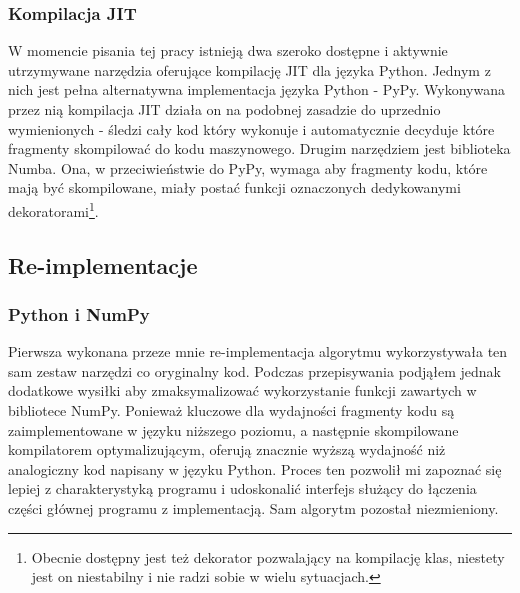 \documentclass[10pt, a4paper]{article}
\begin{document}
\begin{sloppypar}
    \subsubsection{Kompilacja JIT}


    W momencie pisania tej pracy istnieją dwa szeroko dostępne i aktywnie utrzymywane narzędzia
    oferujące kompilację JIT dla języka Python. Jednym z nich jest pełna alternatywna
    implementacja języka Python - PyPy\cite{PyPy_Home_Page}. Wykonywana przez nią
    kompilacja JIT działa on na podobnej zasadzie do uprzednio wymienionych - śledzi
    cały kod który wykonuje i automatycznie decyduje które fragmenty skompilować do kodu
    maszynowego\cite{PyPy_JIT}. Drugim narzędziem jest biblioteka Numba\cite{Numba_Article}\cite{Numba_Doc}.
    Ona, w przeciwieństwie do PyPy, wymaga aby fragmenty kodu, które mają być
    skompilowane, miały postać funkcji oznaczonych dedykowanymi dekoratorami\footnote{Obecnie
    dostępny jest też dekorator pozwalający na kompilację klas, niestety jest on niestabilny
    i nie radzi sobie w wielu sytuacjach.}.

    \newpage


    \subsection{Re-implementacje}


    \subsubsection{ Python i NumPy }


    Pierwsza wykonana przeze mnie re-implementacja algorytmu wykorzystywała ten sam zestaw
    narzędzi co oryginalny kod. Podczas przepisywania podjąłem jednak dodatkowe wysiłki
    aby zmaksymalizować wykorzystanie funkcji zawartych w bibliotece NumPy. Ponieważ kluczowe
    dla wydajności fragmenty kodu są zaimplementowane w języku niższego poziomu, a
    następnie skompilowane kompilatorem optymalizującym, oferują znacznie wyższą wydajność
    niż analogiczny kod napisany w języku Python. Proces ten pozwolił mi zapoznać się
    lepiej z charakterystyką programu i udoskonalić interfejs służący do łączenia części
    głównej programu z implementacją. Sam algorytm pozostał niezmieniony.


\end{sloppypar}
\end{document}
